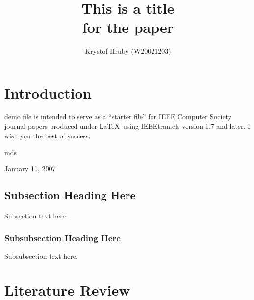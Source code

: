 \documentclass[12pt,journal,compsoc]{IEEEtran}
\begin{document}
\title{This is a title\\ for the paper}

\author{Krystof Hruby (W20021203)}





\maketitle

\IEEEdisplaynotcompsoctitleabstractindextext

\IEEEpeerreviewmaketitle


\section{Introduction}

 demo file is intended to serve as a ``starter file''
for IEEE Computer Society journal papers produced under \LaTeX\ using
IEEEtran.cls version 1.7 and later.
I wish you the best of success.

\hfill mds

\hfill January 11, 2007

\subsection{Subsection Heading Here}
Subsection text here.

\subsubsection{Subsubsection Heading Here}
Subsubsection text here.


\section{Literature Review}
\end{document}
